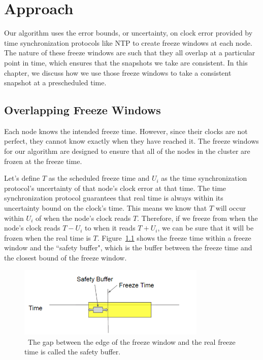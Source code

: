\chapter{Approach}
\label{sec:approach}

Our algorithm uses the error bounds, or uncertainty, on clock error
provided by time synchronization protocols like NTP to create freeze
windows at each node.  The nature of these freeze windows are such
that they all overlap at a particular point in time, which ensures
that the snapshots we take are consistent. In this chapter, we discuss
how we use those freeze windows to take a consistent snapshot at a
prescheduled time.

\section{Overlapping Freeze Windows}

Each node knows the intended freeze time. However, since their clocks
are not perfect, they cannot know exactly when they have reached it.
The freeze windows for our algorithm are designed to ensure that all
of the nodes in the cluster are frozen at the freeze time.

Let's define $T$ as the scheduled freeze time and $U_i$ as the time
synchronization protocol's uncertainty of that node's clock error at
that time.  The time synchronization protocol guarantees that real
time is always within its uncertainty bound on the clock's time. This
means we know that $T$ will occur within $U_i$ of when the node's
clock reads $T$. Therefore, if we freeze from when the node's clock
reads $T - U_i$ to when it reads $T + U_i$, we can be sure that it
will be frozen when the real time is $T$.
Figure~\ref{fig:safety-buff} shows the freeze time within a freeze
window and the ``safety buffer", which is the buffer between the
freeze time and the closest bound of the freeze window.

\begin{figure}
\includegraphics[width=0.8\textwidth]{safety-diagram.png}
\caption{~The gap between the edge of the freeze window and the real freeze time is called the safety buffer.}
\label{fig:safety-buff}
\end{figure}


